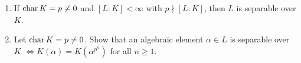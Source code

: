 \begin{exercise} \mbox{}
  \begin{enumerate}
    \item If $\operatorname{char} K = p \ne 0$ and $[L : K] < \infty$ with
      $p \nmid [L : K]$, then $L$ is separable over $K$.
    \item Let $\operatorname{char} K = p \ne 0$. Show that an algebraic element $\alpha \in L$
      is separable over $K$ $\iff K(\alpha) = K\left(\alpha^{p^n}\right)$
      for all $n \ge 1$.
  \end{enumerate}
\end{exercise}

